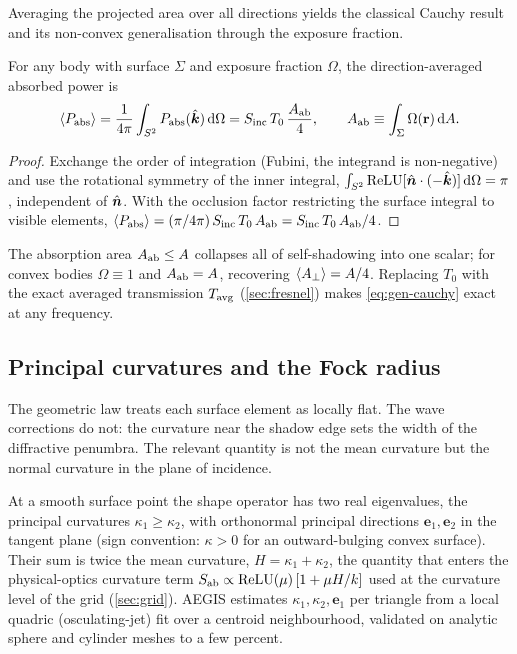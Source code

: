Averaging the projected area over all directions yields the classical Cauchy
result~\cite{Cauchy1841} and its non-convex generalisation through the exposure
fraction.

\begin{theorem}\label{thm:gen-cauchy}
For any body with surface $\Sigma$ and exposure fraction $\Omega$, the
direction-averaged absorbed power is
\begin{equation}\label{eq:gen-cauchy}
  \langle P_{\mathrm{abs}}\rangle
  = \frac{1}{4\pi}\int_{S^2} P_{\mathrm{abs}}(\hat{\bm{k}})\,\mathrm{d}\Omega
  = S_{\mathrm{inc}}\,T_0\,\frac{A_{\mathrm{ab}}}{4},
  \qquad
  A_{\mathrm{ab}} \equiv \int_\Sigma \Omega(\mathbf{r})\,\mathrm{d} A .
\end{equation}
\end{theorem}

\begin{proof}
Exchange the order of integration (Fubini, the integrand is non-negative) and use
the rotational symmetry of the inner integral,
$\int_{S^2}\operatorname{ReLU}[\hat{\bm{n}}\cdot(-\hat{\bm{k}})]\,\mathrm{d}\Omega = \pi$, independent of $\hat{\bm{n}}$.
With the occlusion factor restricting the surface integral to visible elements,
$\langle P_{\mathrm{abs}}\rangle = (\pi/4\pi)\,S_{\mathrm{inc}}\,T_0\,A_{\mathrm{ab}} = S_{\mathrm{inc}}\,T_0\,A_{\mathrm{ab}}/4$.
\end{proof}

The absorption area $A_{\mathrm{ab}}\le A$ collapses all of self-shadowing into one scalar;
for convex bodies $\Omega\equiv 1$ and $A_{\mathrm{ab}}=A$, recovering $\langle A_{\perp}\rangle =
A/4$. Replacing $T_0$ with the exact averaged transmission $T_{\mathrm{avg}}$
(\cref{sec:fresnel}) makes \cref{eq:gen-cauchy} exact at any frequency.

\subsection{Principal curvatures and the Fock radius}\label{sec:geom-curvature}

The geometric law treats each surface element as locally flat. The wave
corrections do not: the curvature near the shadow edge sets the width of the
diffractive penumbra. The relevant quantity is not the mean curvature but the
normal curvature in the plane of incidence.

At a smooth surface point the shape operator has two real eigenvalues, the
principal curvatures $\kappa_1\ge\kappa_2$, with orthonormal principal directions
$\bm{e}_1,\bm{e}_2$ in the tangent plane (sign convention: $\kappa>0$ for an
outward-bulging convex surface). Their sum is twice the mean curvature,
$H=\kappa_1+\kappa_2$, the quantity that enters the physical-optics curvature
term $S_{\mathrm{ab}} \propto \operatorname{ReLU}(\mu)\,[1+\mu H/k]$ used at the curvature level of the
grid (\cref{sec:grid}). AEGIS estimates $\kappa_1,\kappa_2,\bm{e}_1$ per triangle
from a local quadric (osculating-jet) fit over a centroid neighbourhood,
validated on analytic sphere and cylinder meshes to a few percent.

